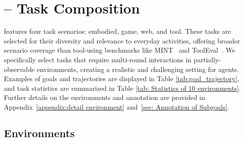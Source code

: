 \section{\BenchName{} -- Task Composition\label{section: task decomposition}}

% 
\BenchName{} features four task scenarios: embodied, game, web, and tool. These tasks are selected for their diversity and relevance to everyday activities, offering broader scenario coverage than tool-using benchmarks like MINT~\citep{wang2023mint} and ToolEval~\citep{qin2023toolllm}. We specifically select tasks that require multi-round interactions in partially-observable environments, creating a realistic and challenging setting for agents. Examples of goals and trajectories are displayed in Table \ref{tab:goal_trajectory}, and task statistics are summarized in Table \ref{tab: Statistics of 10 environments}. Further details on the environments and annotation are provided in Appendix~\ref{appendix:detail environment} and~\ref{sec: Annotation of Subgoals}.



\subsection{Environments}




